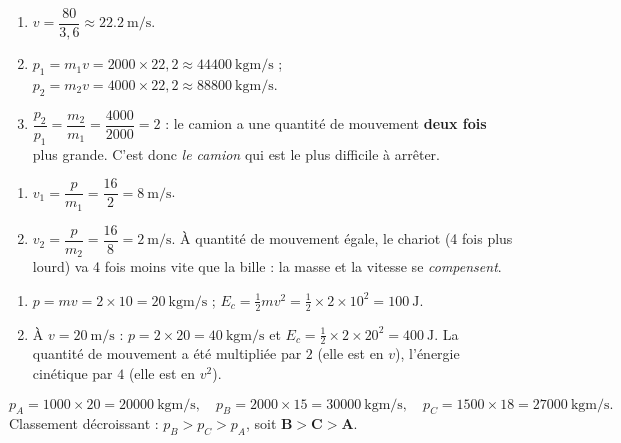 \documentclass[11pt,a4paper]{article}
\begin{document}

\begin{corrige}
\begin{enumerate}[label=\alph*)]
  \item $v=\dfrac{80}{3,6}\approx\qty{22,2}{\metre\per\second}$.
  \item $p_1=m_1 v=2000\times22,2\approx\qty{44400}{\kilogram\metre\per\second}$ ;
        $p_2=m_2 v=4000\times22,2\approx\qty{88800}{\kilogram\metre\per\second}$.
  \item $\dfrac{p_2}{p_1}=\dfrac{m_2}{m_1}=\dfrac{4000}{2000}=2$ : le camion a une quantité de mouvement
        \textbf{deux fois} plus grande. C'est donc \emph{le camion} qui est le plus difficile à arrêter.
\end{enumerate}
\end{corrige}

\begin{corrige}
\begin{enumerate}[label=\alph*)]
  \item $v_1=\dfrac{p}{m_1}=\dfrac{16}{2}=\qty{8}{\metre\per\second}$.
  \item $v_2=\dfrac{p}{m_2}=\dfrac{16}{8}=\qty{2}{\metre\per\second}$. À quantité de mouvement égale, le
        chariot (4 fois plus lourd) va 4 fois moins vite que la bille : la masse et la vitesse se
        \emph{compensent}.
\end{enumerate}
\end{corrige}

\begin{corrige}
\begin{enumerate}[label=\alph*)]
  \item $p=m v=2\times10=\qty{20}{\kilogram\metre\per\second}$ ;
        $E_c=\tfrac12 m v^2=\tfrac12\times2\times10^2=\qty{100}{\joule}$.
  \item À $v=\qty{20}{\metre\per\second}$ : $p=2\times20=\qty{40}{\kilogram\metre\per\second}$ et
        $E_c=\tfrac12\times2\times20^2=\qty{400}{\joule}$. La quantité de mouvement a été multipliée
        par $2$ (elle est en $v$), l'énergie cinétique par $4$ (elle est en $v^2$).
\end{enumerate}
\end{corrige}

\begin{corrige}
\[
p_A=1000\times20=\qty{20000}{\kilogram\metre\per\second},\quad
p_B=2000\times15=\qty{30000}{\kilogram\metre\per\second},\quad
p_C=1500\times18=\qty{27000}{\kilogram\metre\per\second}.
\]
Classement décroissant : $p_B>p_C>p_A$, soit $\mathbf{B}>\mathbf{C}>\mathbf{A}$.
\end{corrige}
\end{document}
